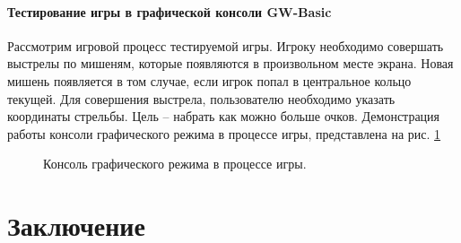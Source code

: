 \documentclass[12pt]{article}
\begin{document}
		\subsection{Тестирование игры в графической консоли GW-Basic}
		\hspace{\parindent} Рассмотрим игровой процесс тестируемой игры. Игроку необходимо совершать выстрелы по мишеням, которые появляются в произвольном месте экрана. Новая мишень появляется в том случае, если игрок попал в центральное кольцо текущей. Для совершения выстрела, пользователю необходимо указать координаты стрельбы. Цель -- набрать как можно больше очков. Демонстрация работы консоли графического режима в процессе игры, представлена на рис. \ref{fig:game}\\
		
		\begin{figure}[h]
			\caption{Консоль графического режима в процессе игры.}
			\label{fig:game}
		\end{figure}
	\newpage	
	
	\part*{\centering Заключение}
	\newpage
	\nocite{*}
			
	
	
	\newpage
	\tableofcontents %

\end{document}
